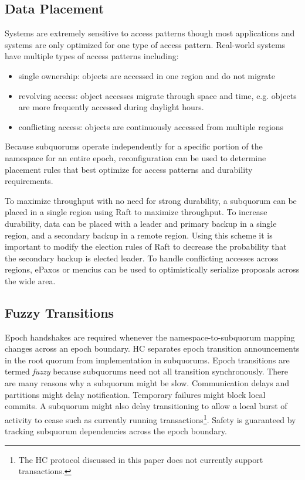 \documentclass[10pt,conference]{IEEEtran}
\newcommand{\sub}{subquorum\xspace}
\newcommand{\subs}{subquorums\xspace}
\newcommand{\roo}{root quorum\xspace}
\begin{document}
\subsection{Data Placement}
\label{section:placement}

Systems are extremely sensitive to access patterns though most applications and systems
are only optimized for one type of access pattern.
Real-world systems have multiple types of access patterns including:

\begin{itemize}
    \item single ownership: objects are accessed in one region and do not migrate
    \item revolving access: object accesses migrate through space and time, e.g. objects
    are more frequently accessed during daylight hours.
    \item conflicting access: objects are continuously accessed from multiple regions
\end{itemize}

Because \subs operate independently for a specific portion of the namespace for an
entire epoch, reconfiguration can be used to determine placement rules that best
optimize for access patterns and durability requirements.

To maximize throughput with no need for strong durability, a \sub can be placed in a
single region using Raft to maximize throughput.
To increase durability, data can be placed with a leader and primary backup in a single
region, and a secondary backup in a remote region.
Using this scheme it is important to modify the election rules of Raft to decrease the
probability that the secondary backup is elected leader.
To handle conflicting accesses across regions, ePaxos or mencius can be used to
optimistically serialize proposals across the wide area.

\subsection{Fuzzy Transitions}
\label{section:fuzzy}

Epoch handshakes are required whenever the namespace-to-\sub mapping changes across an
epoch boundary.
HC separates epoch transition announcements in the
\roo from implementation in \subs.
Epoch transitions are termed \emph{fuzzy} because
\subs need not all transition synchronously.
There are many reasons why a \sub might be slow.
Communication delays and partitions might delay notification.
Temporary failures might block local commits.
A \sub might also delay transitioning to allow a local burst of activity to
cease such as currently running transactions\footnote{The HC protocol
discussed in this paper does not currently support transactions.}.
Safety is guaranteed by tracking \sub dependencies across the epoch boundary.
\end{document}
